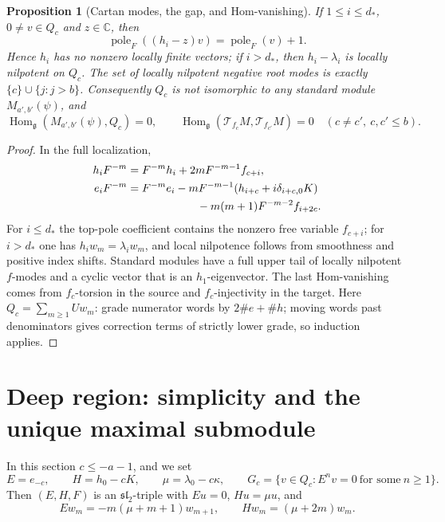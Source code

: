 \documentclass[11pt,a4paper]{article}
\theoremstyle{upright}
\newtheorem{proposition}[theorem]{Proposition}
\newcommand{\C}{\mathbb C}
\newcommand{\g}{\mathfrak g}
\newcommand{\slc}{\mathfrak{sl}_2}
\newcommand{\T}{\mathcal T}
\DeclareMathOperator{\Hom}{Hom}
\DeclareMathOperator{\pole}{pole}
\begin{document}
\begin{proposition}[Cartan modes, the gap, and Hom-vanishing]\label{prop:profiles}
If $1\le i\le d_*$, $0\ne v\in Q_c$ and $z\in\C$, then
\[
\pole_F((h_i-z)v)=\pole_F(v)+1.
\]
Hence $h_i$ has no nonzero locally finite vectors; if $i>d_*$, then
$h_i-\lambda_i$ is locally nilpotent on $Q_c$. The set of locally nilpotent
negative root modes is exactly $\{c\}\cup\{j:j>b\}$. Consequently $Q_c$ is
not isomorphic to any standard module $M_{a',b'}(\psi)$, and
\[
\Hom_\g(M_{a',b'}(\psi),Q_c)=0,
\qquad
\Hom_\g(\T_{f_c}M,\T_{f_{c'}}M)=0\quad(c\ne c',\ c,c'\le b).
\]
\end{proposition}
\begin{proof}
In the full localization,
\begin{equation}\label{eq:commutation}
\begin{aligned}
h_iF^{-m}&=F^{-m}h_i+2mF^{-m-1}f_{c+i},\\
e_iF^{-m}&=F^{-m}e_i-mF^{-m-1}(h_{i+c}+i\delta_{i+c,0}K)\\
&\hspace{22mm}-m(m+1)F^{-m-2}f_{i+2c}.
\end{aligned}
\end{equation}
For $i\le d_*$ the top-pole coefficient contains the nonzero free variable
$f_{c+i}$; for $i>d_*$ one has $h_iw_m=\lambda_iw_m$, and local nilpotence
follows from smoothness and positive index shifts. Standard modules have a
full upper tail of locally nilpotent $f$-modes and a cyclic vector that is an
$h_1$-eigenvector. The last Hom-vanishing comes from $f_c$-torsion in the
source and $f_c$-injectivity in the target. Here $Q_c=\sum_{m\ge1}Uw_m$:
grade numerator words by $2\#e+\#h$; moving words past denominators gives
correction terms of strictly lower grade, so induction applies.
\end{proof}

\section{Deep region: simplicity and the unique maximal submodule}

In this section $c\le-a-1$, and we set
\[
E=e_{-c},\qquad H=h_0-cK,\qquad \mu=\lambda_0-c\kappa,
\qquad G_c=\{v\in Q_c:E^nv=0\ \text{for some}\ n\ge1\}.
\]
Then $(E,H,F)$ is an $\slc$-triple with $Eu=0$, $Hu=\mu u$, and
\begin{equation}\label{eq:pure}
Ew_m=-m(\mu+m+1)w_{m+1},\qquad Hw_m=(\mu+2m)w_m.
\end{equation}
\end{document}
